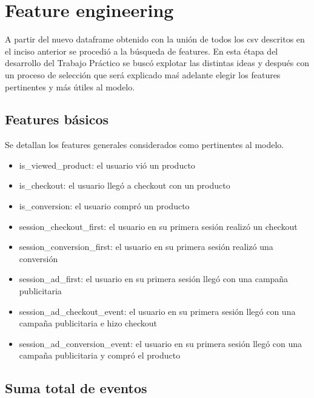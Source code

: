 \documentclass[a4paper]{article}
\begin{document}
\section{Feature engineering}

A partir del nuevo dataframe obtenido con la unión de todos los csv descritos en el inciso anterior se procedió a la búsqueda de features. En esta étapa del desarrollo del Trabajo Práctico se buscó explotar las distintas ideas y después con un proceso de selección que será explicado maś adelante elegir los features pertinentes y más útiles al modelo. 

\subsection{Features básicos}
Se detallan los features generales considerados como pertinentes al modelo.

\begin{itemize}
	\item is\_viewed\_product: el usuario vió un producto
	\item is\_checkout: el usuario llegó a checkout con un producto
	\item is\_conversion: el usuario compró un producto
	\item session\_checkout\_first: el usuario en su primera sesión realizó un checkout
	\item session\_conversion\_first: el usuario en su primera sesión realizó una conversión
	\item session\_ad\_first: el usuario en su primera sesión llegó con una campaña publicitaria
	\item session\_ad\_checkout\_event: el usuario en su primera sesión llegó con una campaña publicitaria e hizo checkout
	\item session\_ad\_conversion\_event: el usuario en su primera sesión llegó con una campaña publicitaria y compró el producto	
\end{itemize}	
	
\subsection{Suma total de eventos}
\end{document}
